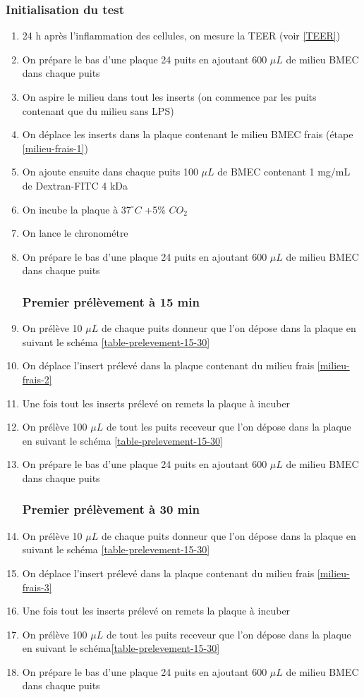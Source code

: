 \subsubsection{Initialisation du test}
\begin{enumerate}
\item 24 h après l'inflammation des cellules, on mesure la TEER (voir \ref{TEER})
\item On prépare le bas d'une plaque 24 puits en ajoutant 600 $\mu L$ de milieu BMEC dans chaque puits \label{milieu-frais-1}
\item On aspire le milieu dans tout les inserts (on commence par les puits contenant que du milieu sans LPS)
\item On déplace les inserts dans la plaque contenant le milieu BMEC frais (étape \ref{milieu-frais-1})
\item On ajoute ensuite dans chaque puits 100 $\mu L$ de BMEC contenant 1 mg/mL de Dextran-FITC 4 kDa
\item On incube la plaque à $37^\circ C$ +5\% $CO_2$
\item On lance le chronométre
\item On prépare le bas d'une plaque 24 puits  en ajoutant 600 $\mu L$ de milieu BMEC dans chaque puits \label{milieu-frais-2}
\subsubsection{Premier prélèvement à \textbf{15 min}}
\item On prélève 10 $\mu L$ de chaque puits donneur que l'on dépose dans la plaque en suivant le schéma \ref{table-prelevement-15-30}
\item On déplace l'insert prélevé dans la plaque contenant du milieu frais \ref{milieu-frais-2}
\item Une fois tout les inserts prélevé on remets la plaque à incuber
\item On prélève 100 $\mu L$ de tout les puits receveur que l'on dépose dans la plaque en suivant le schéma \ref{table-prelevement-15-30}
\item On prépare le bas d'une plaque 24 puits  en ajoutant 600 $\mu L$ de milieu BMEC dans chaque puits \label{milieu-frais-3}
\subsubsection{Premier prélèvement à \textbf{30 min}}
\item On prélève 10 $\mu L$ de chaque puits donneur que l'on dépose dans la plaque en suivant le schéma \ref{table-prelevement-15-30}
\item On déplace l'insert prélevé dans la plaque contenant du milieu frais \ref{milieu-frais-3}
\item Une fois tout les inserts prélevé on remets la plaque à incuber
\item On prélève 100 $\mu L$ de tout les puits receveur que l'on dépose dans la plaque en suivant le schéma\ref{table-prelevement-15-30}
\item On prépare le bas d'une plaque 24 puits  en ajoutant 600 $\mu L$ de milieu BMEC dans chaque puits \label{milieu-frais-4}

\end{enumerate}
